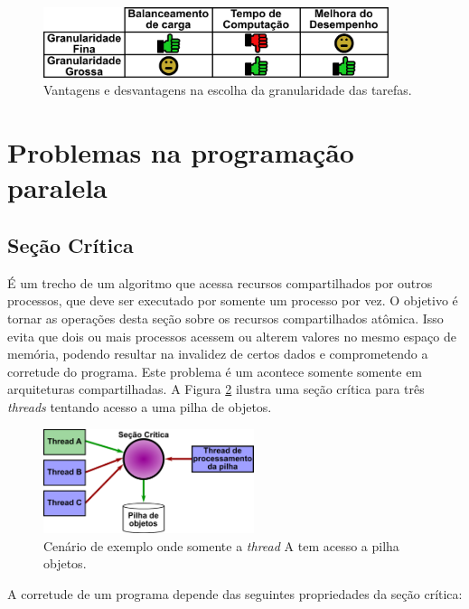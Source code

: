 \begin{figure}[htbp]
	\centering
	\includegraphics[width=0.9\textwidth]{fig/tabela_granularidade.png}
	\caption{Vantagens e desvantagens na escolha da granularidade das tarefas.} 
	\label{fig:tabela_granularidade}
\end{figure}

\section{Problemas na programação paralela}

\subsection{Seção Crítica}

É um trecho de um algoritmo que acessa recursos compartilhados por outros processos, que deve ser executado por somente um processo por vez. O objetivo é tornar as operações desta seção sobre os recursos compartilhados atômica. Isso evita que dois ou mais processos acessem ou alterem valores no mesmo espaço de memória, podendo resultar na invalidez de certos dados e comprometendo a corretude do programa. Este problema é um acontece somente somente em arquiteturas compartilhadas. A Figura \ref{fig:secao_critica} ilustra uma seção crítica para três \textit{threads} tentando acesso a uma pilha de objetos.

\begin{figure}[htbp]
	\centering
	\includegraphics[width=0.55\textwidth]{fig/secao_critica.png}
	\caption{Cenário de exemplo onde somente a \textit{thread} A tem acesso a pilha objetos.} 
	\label{fig:secao_critica}
\end{figure}

A corretude  de um programa depende das seguintes propriedades da seção crítica:

